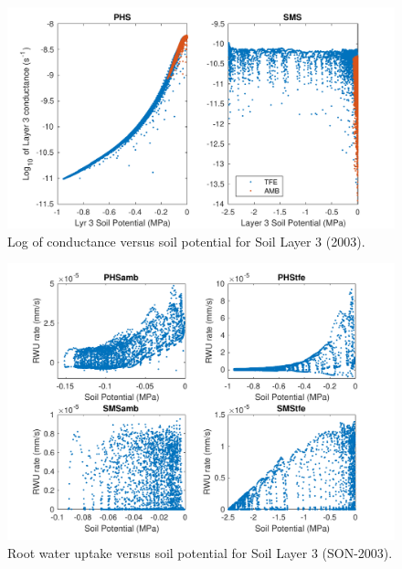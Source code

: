 \documentclass[draft,linenumbers]{agujournal}
\begin{document}
  \begin{figure}[h]
     \centering
     \includegraphics[width=30pc]{../figs2/suppfig2.pdf}
     \caption{Log of conductance versus soil potential for Soil Layer 3 (2003).}
     \label{supp:cond2}
  \end{figure}
  \clearpage
  
    \begin{figure}[h]
     \centering
     \includegraphics[width=30pc]{../figs2/supp_rwu.pdf}
     \caption{Root water uptake versus soil potential for Soil Layer 3 (SON-2003).}
     \label{supp:rwu}
  \end{figure}
  \clearpage
\end{document}
